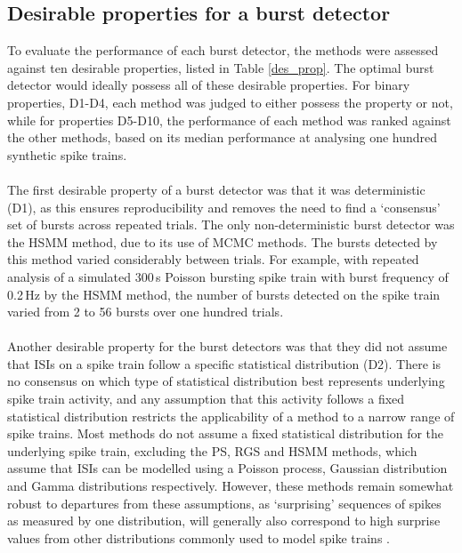 \documentclass[12pt, titlepage]{article}
\begin{document}
	\subsection*{Desirable properties for a burst detector}
	To evaluate the performance of each burst detector, the methods were assessed against ten desirable properties, listed in Table \ref{des_prop}. The optimal burst detector would ideally possess all of these desirable properties. For binary properties, D1-D4, each method was judged to either possess the property or not, while for properties D5-D10, the performance of each method was ranked against the other methods, based on its median performance at analysing one hundred synthetic spike trains. 
	\\ \\ The first desirable property of a burst detector was that it was deterministic (D1), as this ensures reproducibility and removes the need to find a `consensus' set of bursts across repeated trials. The only non-deterministic burst detector was the HSMM method, due to its use of MCMC methods. The bursts detected by this method varied considerably between trials. For example, with repeated analysis of a simulated $300\,$s Poisson bursting spike train with burst frequency of 0.2$\,$Hz by the HSMM method, the number of bursts detected on the spike train varied from 2 to 56 bursts over one hundred trials. 
	\\ \\ Another desirable property for the burst detectors was that they did not assume that ISIs on a spike train follow a specific statistical distribution (D2). There is no consensus on which type of statistical distribution best represents underlying spike train activity, and any assumption that this activity follows a fixed statistical distribution restricts the applicability of a method to a narrow range of spike trains. Most methods do not assume a fixed statistical distribution for the underlying spike train, excluding the PS, RGS and HSMM methods, which assume that ISIs can be modelled using a Poisson process, Gaussian distribution and Gamma distributions respectively. However, these methods remain somewhat robust to departures from these assumptions, as `surprising' sequences of spikes as measured by one distribution, will generally also correspond to high surprise values from other distributions commonly used to model spike trains \cite{Legendy1985}. 
\end{document}
